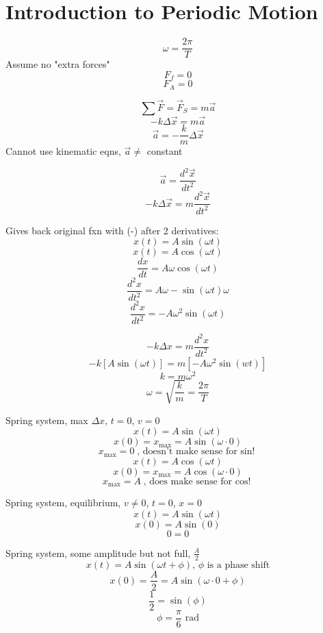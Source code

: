 \documentclass[fleqn]{article}
\begin{document}
\setlength{\mathindent}{0pt}
\section*{Introduction to Periodic Motion}
\[ \boxed {\omega = \frac{2 \pi}{T}  }\]
Assume no "extra forces"
\[ F_f = 0 \]
\[ F_A = 0 \]

\[ \sum \vec{F} = \vec{F}_{S} = m \vec{a}     \]
\[\boxed{ -k \Delta \vec{x} = m \vec{a}  } \]
\[ \boxed {\vec{a} = - \frac{k}{m} \Delta \vec{x} }  \]
Cannot use kinematic eqns, $\vec{a} \ne$ constant

\[ \vec{a} = \frac{d^2 \vec{x} }{dt^2}  \]
\[ -k \Delta \vec{x} = m \frac{d^2 \vec{x} }{dt^2}  \]

Gives back original fxn with (-) after 2 derivatives:
\[ x(t) = A \sin \left( \omega t \right) \]
\[ x(t) = A \cos \left( \omega t \right) \]
\[ \frac{dx}{dt} = A \omega \cos \left( \omega t \right) \]
\[ \frac{d^2x}{dt^2} = A \omega - \sin \left( \omega t \right) \omega  \]
\[ \frac{d^2x}{dt^2} = -A \omega ^2 \sin \left( \omega t \right)\]

\[ -k \Delta x = m \frac{d^2x}{dt^2}  \]
\[ -k \left[ A \sin \left( \omega t \right) \right] = m \left[ -A \omega ^2 \sin \left( wt \right) \right]\]
\[ \boxed {k = m \omega ^2 }\]
\[ \boxed {\omega = \sqrt{\frac{k}{m} } = \frac{2 \pi}{T} } \]

Spring system, max $\Delta x$, $t=0$, $v=0$
\[ x(t) = A \sin \left( \omega t \right) \]
\[ x(0) = x_{\text{max} } = A \sin \left( \omega \cdot 0 \right) \]
\[ x_{\text{max} } = 0  \text{, doesn't make sense for $\sin$!} \]
\[ x(t) = A \cos \left( \omega t \right) \]
\[ x(0) = x_{\text{max} } = A \cos \left( \omega \cdot 0 \right) \]
\[ x_{\text{max} } = A  \text{, does make sense for $\cos$!} \]

Spring system, equilibrium, $v \ne 0$, $t=0$, $x=0$
\[ x(t) = A \sin \left( \omega t \right) \]
\[ x(0) = A \sin \left( 0 \right) \]
\[ 0 = 0 \]

Spring system, some amplitude but not full, $\frac{A}{2}$
\[ \boxed {x(t) = A \sin \left( \omega t + \phi \right) }\text{, $\phi$ is a phase shift}  \]
\[ x(0) = \frac{A}{2} = A \sin \left( \omega  \cdot 0 + \phi \right) \]
\[ \frac{1}{2} = \sin \left( \phi \right) \]
\[ \phi = \frac{\pi}{6} \text{ rad}  \]
\end{document}
